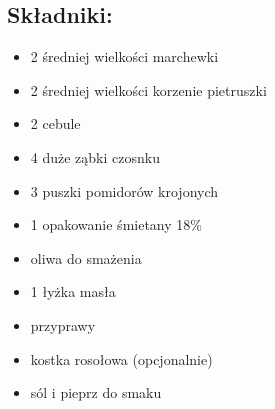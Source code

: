 \documentclass[a4paper,10pt]{book}
\begin{document}
\begin{multicols}{2}

\section*{Składniki:}
\begin{itemize}
    \item 2 średniej wielkości marchewki
    \item 2 średniej wielkości korzenie pietruszki
    \item 2 cebule
    \item 4 duże ząbki czosnku
    \item 3 puszki pomidorów krojonych
    \item 1 opakowanie śmietany 18\%
    \item oliwa do smażenia
    \item 1 łyżka masła
    \item przyprawy
    \item kostka rosołowa (opcjonalnie)
    \item sól i pieprz do smaku
\end{itemize}

\columnbreak

\begin{figure}[H]
    \centering
\end{figure}
\end{multicols}

\vspace{0.5cm} 
\end{document}
